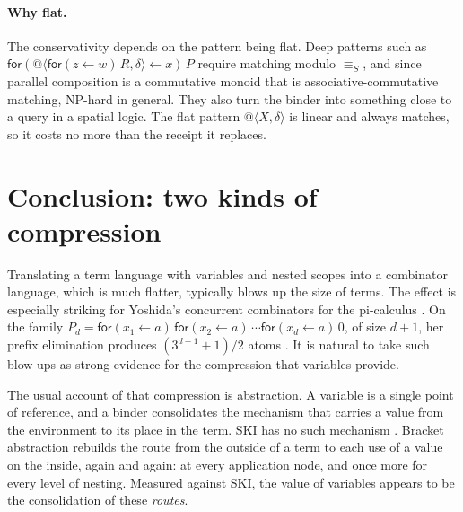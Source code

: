 \documentclass[11pt,a4paper]{article}
\theoremstyle{plain}
\theoremstyle{definition}
\theoremstyle{remark}
\newcommand{\rcv}[3]{\mathsf{for}(#1 \leftarrow #2)\,#3}
\newcommand{\scong}{\equiv_{S}}
\begin{document}
\paragraph{Why flat.} The conservativity depends on the pattern being flat.
Deep patterns such as $\rcv{@\langle\rcv{z}{w}{R},\delta\rangle}{x}{P}$
require matching modulo $\scong$, and since parallel composition is a
commutative monoid that is associative-commutative matching, NP-hard in
general. They also turn the binder into something close to a query in a
spatial logic. The flat pattern $@\langle X,\delta\rangle$ is linear and
always matches, so it costs no more than the receipt it replaces.

\section{Conclusion: two kinds of compression}\label{sec:conclusion}

Translating a term language with variables and nested scopes into a
combinator language, which is much flatter, typically blows up the size of
terms. The effect is especially striking for Yoshida's concurrent combinators
for the pi-calculus \cite{Yoshida02}. On the family
$P_d=\rcv{x_1}{a}{\rcv{x_2}{a}{\cdots\rcv{x_d}{a}{0}}}$, of size $d+1$, her
prefix elimination produces $(3^{d-1}+1)/2$ atoms \cite{RC3}. It is natural
to take such blow-ups as strong evidence for the compression that variables
provide.

The usual account of that compression is abstraction. A variable is a single
point of reference, and a binder consolidates the mechanism that carries a
value from the environment to its place in the term. SKI has no such
mechanism \cite{CF58}. Bracket abstraction rebuilds the route from the outside
of a term to each use of a value on the inside, again and again: at every
application node, and once more for every level of nesting. Measured against
SKI, the value of variables appears to be the consolidation of these
\emph{routes}.
\end{document}
